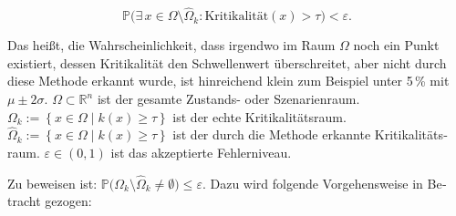 \begin{otherlanguage}{ngerman}
\[ 
\mathbb{P}\bigl(\exists\, x \in \Omega \setminus \widehat{\Omega}_k : \text{Kritikalität}(x) > \tau \bigr) < \varepsilon. 
\]

Das heißt, die Wahrscheinlichkeit, dass irgendwo im Raum $\Omega$ noch ein Punkt existiert, dessen Kritikalität den Schwellenwert überschreitet, aber nicht durch diese Methode erkannt wurde, ist hinreichend klein zum Beispiel unter 5\,\% mit $\mu \pm 2\sigma$. $\Omega \subset \mathbb{R}^{n}$ ist der gesamte Zustands- oder Szenarienraum. $\Omega_k := \left\{ x \in \Omega \;\big|\; k(x) \ge \tau \right\}$ ist der echte Kritikalitätsraum. $\widehat{\Omega}_k := \left\{ x \in \Omega \;\big|\; k(x) \ge \tau \right\}$ ist der durch die Methode erkannte Kritikalitätsraum. $\varepsilon \in (0,1)$ ist das akzeptierte Fehlerniveau.

Zu beweisen ist: $\mathbb{P}\bigl( \Omega_k \setminus \widehat{\Omega}_k \neq \emptyset \bigr) \le \varepsilon.$ Dazu wird folgende Vorgehensweise in Betracht gezogen: 



\end{otherlanguage}
